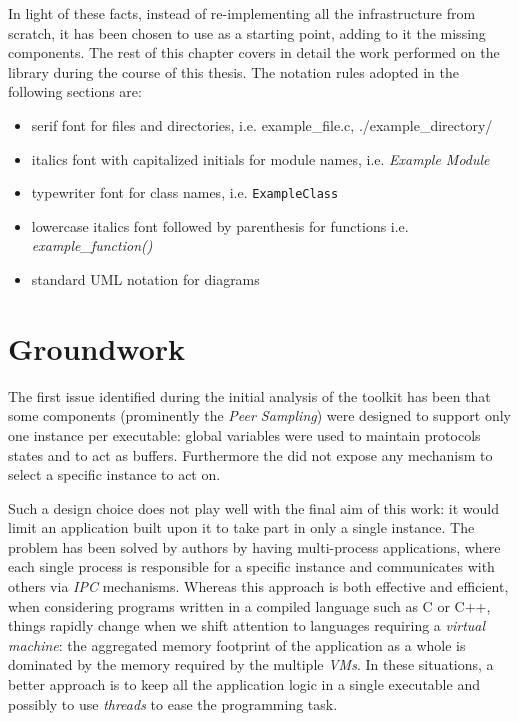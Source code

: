 In light of these facts, instead of re-implementing all the
infrastructure from scratch, it has been chosen to use \grapes as a
starting point, adding to it the missing components.
The rest of this chapter covers in detail the work performed on
the library during the course of this thesis. The notation rules
adopted in the following sections are:
\begin{itemize}
  \item serif font for files and directories, i.e. \textsf{example\_file.c},
    \textsf{./example\_directory/}
  \item italics font with capitalized initials for module names,
    i.e. \textit{Example Module}
 \item typewriter font for class names, i.e. \texttt{ExampleClass}
  \item lowercase italics font followed by parenthesis for functions
    i.e. \textit{example\_function()}
  \item standard UML notation for diagrams
\end{itemize}

\section{Groundwork}
The first issue identified during the initial analysis of
the toolkit has been that some components (prominently the \textit{Peer
  Sampling}) were designed to support only one instance per
executable: global variables were used to maintain protocols states and
to act as buffers. Furthermore the \api did not expose any mechanism
to select a specific instance to act on.

Such a design choice does not play well with the final aim of this work: it
would limit an application built upon it to take part in only a single
\peersampling instance. The problem has been solved by \grapes authors by
having multi-process applications, where each single process is
responsible for a specific instance and communicates with others
via \emph{IPC} mechanisms. Whereas this approach is both effective and
efficient, when considering programs written in a compiled language
such as C or C++, things rapidly change when we shift attention to
languages requiring a \emph{virtual machine}: the aggregated memory
footprint of the application as a whole is dominated by the memory
required by the multiple \emph{VMs}. In these situations, a better
approach is to keep all the application logic in a single executable
and possibly to use \emph{threads} to ease the programming task.

